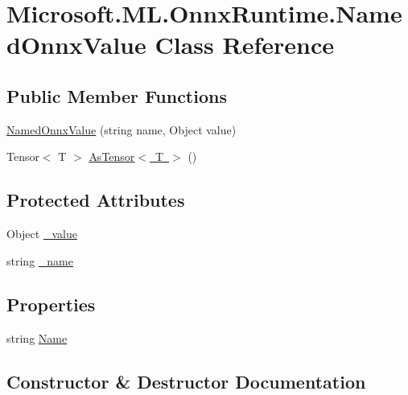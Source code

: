 \hypertarget{classMicrosoft_1_1ML_1_1OnnxRuntime_1_1NamedOnnxValue}{}\section{Microsoft.\+M\+L.\+Onnx\+Runtime.\+Named\+Onnx\+Value Class Reference}
\label{classMicrosoft_1_1ML_1_1OnnxRuntime_1_1NamedOnnxValue}
\subsection*{Public Member Functions}
\begin{DoxyCompactItemize}
\item 
\mbox{\hyperlink{classMicrosoft_1_1ML_1_1OnnxRuntime_1_1NamedOnnxValue_a62f08fabd9f3f9e4bb795f6f5f7e94a6}{Named\+Onnx\+Value}} (string name, Object value)
\item 
Tensor$<$ T $>$ \mbox{\hyperlink{classMicrosoft_1_1ML_1_1OnnxRuntime_1_1NamedOnnxValue_acbbc2b7be258596224bbc794ed983d46}{As\+Tensor$<$ T $>$}} ()
\end{DoxyCompactItemize}
\subsection*{Protected Attributes}
\begin{DoxyCompactItemize}
\item 
Object \mbox{\hyperlink{classMicrosoft_1_1ML_1_1OnnxRuntime_1_1NamedOnnxValue_a4c2b7ad208384a65eca7d567642376eb}{\+\_\+value}}
\item 
string \mbox{\hyperlink{classMicrosoft_1_1ML_1_1OnnxRuntime_1_1NamedOnnxValue_afa0413b0bc4d0852035bbc3210f9a802}{\+\_\+name}}
\end{DoxyCompactItemize}
\subsection*{Properties}
\begin{DoxyCompactItemize}
\item 
string \mbox{\hyperlink{classMicrosoft_1_1ML_1_1OnnxRuntime_1_1NamedOnnxValue_a152337b6480aeec4b7e01d78ff212eee}{Name}}
\end{DoxyCompactItemize}


\subsection{Constructor \& Destructor Documentation}
\mbox{\label{classMicrosoft_1_1ML_1_1OnnxRuntime_1_1NamedOnnxValue_a62f08fabd9f3f9e4bb795f6f5f7e94a6}} 
